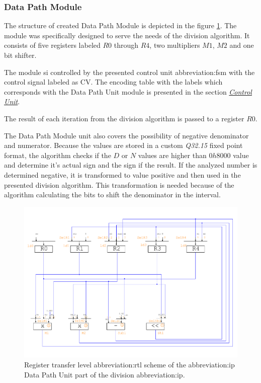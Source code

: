 \documentclass[a4paper, twoside, 11pt]{article}
\begin{document}
\subsubsection{Data Path Module}
The structure of created Data Path Module is depicted in the figure \ref{fig:division-rtl}. The module was specifically designed to serve the needs of the division algorithm. It consists of five registers labeled $R0$ through $R4$, two multipliers $M1$, $M2$ and one bit shifter.\par
The module si controlled by the presented control unit \gls{abbreviation:fsm} with the control signal labeled as CV. The encoding table with the labels which corresponds with the Data Path Unit module is presented in the section \hyperref[subsubsection:division-control-unit]{\textit{Control Unit}}.\par
The result of each iteration from the division algorithm is passed to a register $R0$.\par
The Data Path Module unit also covers the possibility of negative denominator and numerator. Because the values are stored in a custom \textit{Q32.15} fixed point format, the algorithm checks if the $D$ or $N$ values are higher than $0h8000$ value and determine it's actual sign and the sign if the result. If the analyzed number is determined negative, it is transformed to value positive and then used in the presented division algorithm. This transformation is needed because of the algorithm calculating the bits to shift the denominator in the interval.
\begin{figure}[htbp!]
  \centering
  \includegraphics[width=1\textwidth]{src/pdf/rtl.pdf}
   \caption{Register transfer level \gls{abbreviation:rtl} scheme of the \gls{abbreviation:ip} Data Path Unit part of the division \gls{abbreviation:ip}.}
  \label{fig:division-rtl}
\end{figure}
\end{document}
